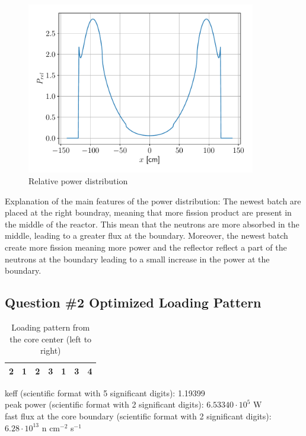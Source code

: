 \documentclass[11pt,a4paper]{article}
\begin{document}
\begin{figure}[h]
	\includegraphics[width=10cm]{fig/Ex4_Power.pdf}
	\centering
	\caption{Relative power distribution}
\end{figure}

Explanation of the main features of the power distribution: The newest batch are placed at the right boundray, meaning that more fission product are present in the middle of the reactor. This mean that the neutrons are more absorbed in the middle, leading to a greater flux at the boundary. Moreover, the newest batch create more fission meaning more power and the reflector reflect a part of the neutrons at the boundary leading to a small increase in the power at the boundary. \\


\subsection{Question \#2 Optimized Loading Pattern}

\begin{table}[H]
	\centering
	\begin{tabular}{|c|c|c|c|c|c|c|}
		\hline
		2& 1& 2& 3& 1& 3& 4\\
		\hline
	\end{tabular}
	\caption{Loading pattern from the core center (left to right)}
\end{table}

keff (scientific format with 5 significant digits): 1.19399 \\

peak power (scientific format with 2 significant digits): $6.53340 \cdot 10^{5}$ W\\

fast flux at the core boundary (scientific format with 2 significant digits):$6.28 \cdot 10^{13}$ n cm$^{-2}$ s$^{-1}$\\
\end{document}
